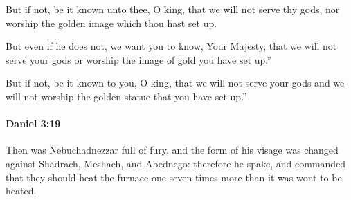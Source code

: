 			\begin{versebox}
					\item[BHS] 
					\item[LXX] 
					\item[ASV] But if not, be it known unto thee, O king, that we will not serve thy gods, nor worship the golden image which thou hast set up.
					\item[NIV] But even if he does not, we want you to know, Your Majesty, that we will not serve your gods or worship the image of gold you have set up.”
					\item[NRSV] But if not, be it known to you, O king, that we will not serve your gods and we will not worship the golden statue that you have set up.”
			\end{versebox}

		\paragraph{Daniel 3:19} %
			\label{DANIEL-3-19}

			Then was Nebuchadnezzar full of fury, and the form of his visage was changed against Shadrach, Meshach, and Abednego: therefore he spake, and commanded that they should heat the furnace one seven times more than it was wont to be heated.

